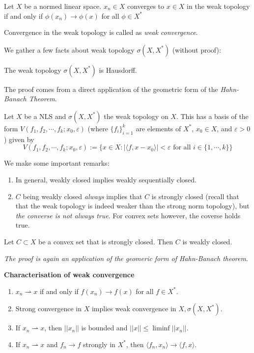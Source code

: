 \begin{proposition}
    Let $X$ be a normed linear space. $x_n\in X$ converges to $x\in X$ in the weak topology if and only if $\phi(x_n)\to\phi(x)$ for all $\phi\in X^*$ 
\end{proposition}
Convergence in the weak topology is called as \emph{weak convergence}. 

We gather a few facts about weak topology $\sigma(X,X^*)$ (without proof):
\begin{lemma}
    The weak topology $\sigma(X,X^*)$ is Hausdorff. 
\end{lemma}
The proof comes from a direct application of the geometric form of the \emph{Hahn-Banach Theorem}.
\begin{proposition}
    Let $X$ be a NLS and $\sigma(X,X^*)$ the weak topology on $X$. This has a basis of the form $V(f_1,f_2,\cdots,f_k;x_0,\varepsilon)$ (where $\{f_i\}_{i=1}^k$ are elements of $X^*$, $x_0\in X$, and $\varepsilon>0$) given by $$V(f_1,f_2,\cdots,f_k;x_0,\varepsilon):=\{x\in X: |\langle f,x-x_0\rangle|<\varepsilon \text{ for all }i\in \{1,\cdots,k\}\} $$
\end{proposition}
\begin{remark} We make some important remarks:
    \begin{enumerate}
        \item In general, weakly closed implies weakly sequentially closed.
        \item $C$ being weakly closed \emph{always} implies that $C$ is strongly closed (recall that that the weak topology is indeed weaker than the strong norm topology), but \emph{the converse is not always true}. For convex sets however, the coverse holds true.
    \end{enumerate}
\end{remark}

\begin{lemma}
    Let $C\subset X$ be a convex set that is strongly closed. Then $C$ is weakly closed.
\end{lemma}
\emph{The proof is again an application of the geomeric form of Hahn-Banach theorem}.

\begin{theorem}{\label{thm:characterisation_of_weak_convergence}
\textbf{Characterisation of weak convergence \cite{Brezis2011}}    
\begin{enumerate}
    \item $x_n \rightharpoonup x$ if and only if $f(x_n)\to f(x)$ for all $f\in X^*$.
    \item Strong convergence in $X$ implies weak convergence in $X,\sigma(X,X^*)$.
    \item If $x_n \rightharpoonup x$, then $||x_n||$ is bounded and $||x||\leq \liminf ||x_n||$.
    \item If $x_n\rightharpoonup x$ and $f_n\to f$ strongly in $X^*$, then $\langle f_n,x_n\rangle \to \langle f,x\rangle$.
\end{enumerate}}\end{theorem}

